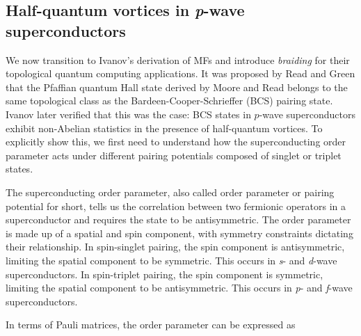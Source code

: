 \subsection{Half-quantum vortices in \textit{p}-wave superconductors}
We now transition to Ivanov's derivation of MFs \cite{ivanovNonAbelianStatisticsHalfQuantum2001} and introduce \textit{braiding} for their topological quantum computing applications.
It was proposed by Read and Green that the Pfaffian quantum Hall state derived by Moore and Read belongs to the same topological class as the Bardeen-Cooper-Schrieffer (BCS) pairing state.
Ivanov later verified that this was the case: BCS states in $p$-wave superconductors exhibit non-Abelian statistics in the presence of half-quantum vortices.
To explicitly show this, we first need to understand how the superconducting order parameter acts under different pairing potentials composed of singlet or triplet states.

The superconducting order parameter, also called order parameter or pairing potential for short, tells us the correlation between two fermionic operators in a superconductor and requires the state to be antisymmetric.
The order parameter is made up of a spatial and spin component, with symmetry constraints dictating their relationship.
In spin-singlet pairing, the spin component is antisymmetric, limiting the spatial component to be symmetric.
This occurs in \textit{s}- and \textit{d}-wave superconductors.
In spin-triplet pairing, the spin component is symmetric, limiting the spatial component to be antisymmetric.
This occurs in \textit{p}- and \textit{f}-wave superconductors.

In terms of Pauli matrices, the order parameter can be expressed as

